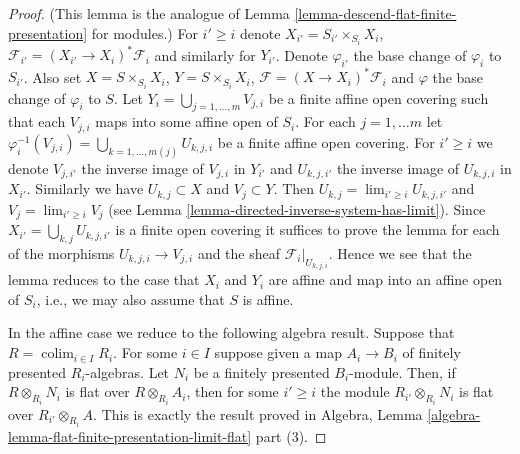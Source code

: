 \documentclass[10pt,a4paper]{amsart}
\theoremstyle{plain}
\theoremstyle{definition}
\theoremstyle{remark}
\numberwithin{equation}{subsection}
\def\lim{\mathop{\mathrm{lim}}\nolimits}
\def\colim{\mathop{\mathrm{colim}}\nolimits}
\begin{document}
\begin{proof}
(This lemma is the analogue of
Lemma \ref{lemma-descend-flat-finite-presentation}
for modules.)
For $i' \geq i$ denote $X_{i'} = S_{i'} \times_{S_i} X_i$,
$\mathcal{F}_{i'} = (X_{i'} \to X_i)^*\mathcal{F}_i$ and similarly
for $Y_{i'}$. Denote $\varphi_{i'}$ the base change
of $\varphi_i$ to $S_{i'}$. Also set $X = S \times_{S_i} X_i$,
$Y =S \times_{S_i} X_i$, $\mathcal{F} = (X \to X_i)^*\mathcal{F}_i$
and $\varphi$ the base change of $\varphi_i$ to $S$.
Let $Y_i = \bigcup_{j = 1, \ldots, m} V_{j, i}$ be a finite affine open
covering such that each $V_{j, i}$ maps into some affine open of $S_i$.
For each $j = 1, \ldots m$ let
$\varphi_i^{-1}(V_{j, i}) = \bigcup_{k = 1, \ldots, m(j)} U_{k, j, i}$
be a finite affine open covering. For $i' \geq i$ we denote
$V_{j, i'}$ the inverse image of $V_{j, i}$ in $Y_{i'}$ and
$U_{k, j, i'}$ the inverse image of $U_{k, j, i}$ in $X_{i'}$.
Similarly we have $U_{k, j} \subset X$ and $V_j \subset Y$.
Then $U_{k, j} = \lim_{i' \geq i} U_{k, j, i'}$
and $V_j = \lim_{i' \geq i} V_j$
(see Lemma \ref{lemma-directed-inverse-system-has-limit}).
Since $X_{i'} = \bigcup_{k, j} U_{k, j, i'}$ is a finite open covering
it suffices to prove the lemma for each of the morphisms
$U_{k, j, i} \to V_{j, i}$ and the sheaf $\mathcal{F}_i|_{U_{k, j, i}}$.
Hence we see that the lemma reduces to the case that $X_i$ and
$Y_i$ are affine and map into an affine open of $S_i$, i.e., we
may also assume that $S$ is affine.

\medskip\noindent
In the affine case we reduce to the following algebra result.
Suppose that $R = \colim_{i \in I} R_i$. For some $i \in I$
suppose given a map $A_i \to B_i$ of finitely presented $R_i$-algebras.
Let $N_i$ be a finitely presented $B_i$-module.
Then, if $R \otimes_{R_i} N_i$ is flat over $R \otimes_{R_i} A_i$,
then for some $i' \geq i$ the module
$R_{i'} \otimes_{R_i} N_i$ is flat over $R_{i'} \otimes_{R_i} A$.
This is exactly the result proved in
Algebra,
Lemma \ref{algebra-lemma-flat-finite-presentation-limit-flat} part (3).
\end{proof}
\end{document}
